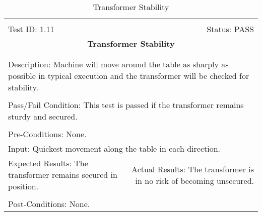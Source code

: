 \documentclass[titlepage]{article}
\begin{document}
\begin{center}
\begin{table}[h!]
\begin{tabular}{|l r|}\hline&\\[-2mm]
	Test ID: 1.11	&Status: PASS\\[-3mm]
	\multicolumn{2}{|c|}{\textbf{\large{Transformer Stability}}}\\&\\\hline&\\[-3mm]
	\multicolumn{2}{|p{\textwidth}|}{Description: Machine will move around the table as sharply as possible in typical execution and the transformer will be checked for stability.}\\[1mm]\hline&\\[-3mm]
	\multicolumn{2}{|p{\textwidth}|}{Pass/Fail Condition: This test is passed if the transformer remains sturdy and secured.}\\[1mm]\hline&\\[-3mm]
	\multicolumn{2}{|p{\textwidth}|}{Pre-Conditions: None.}\\[4mm]
	\multicolumn{2}{|p{\textwidth}|}{Input: Quickest movement along the table in each direction.}\\[2mm]\hline
	\multicolumn{1}{|p{0.49\textwidth}}{Expected Results: The transformer remains secured in position.}	&\multicolumn{1}{|p{0.45\textwidth}|}{Actual Results: The transformer is in no risk of becoming unsecured.}\\\hline&\\[-3mm]
	\multicolumn{2}{|p{\textwidth}|}{Post-Conditions: None.}\\\hline
\end{tabular}
\caption{Transformer Stability}
\end{table}
\end{center}
\newpage
\end{document}
